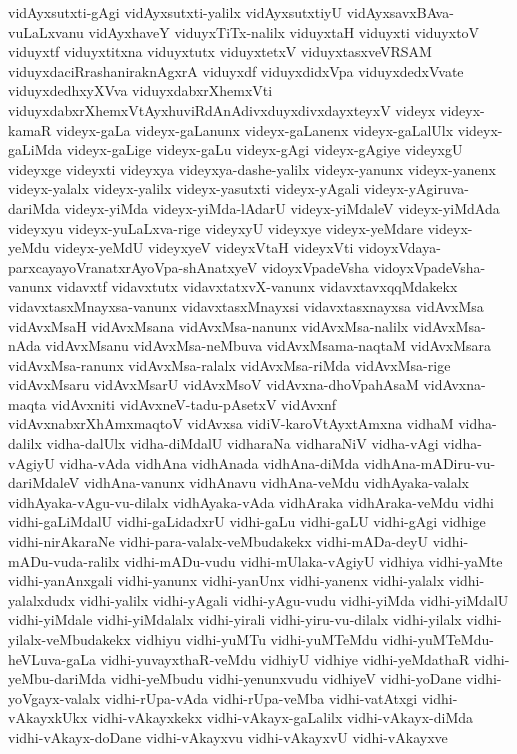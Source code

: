 {vidAyxsutxti-gAgi
vidAyxsutxti-yalilx
vidAyxsutxtiyU
vidAyxsavxBAva-vuLaLxvanu
vidAyxhaveY
viduyxTiTx-nalilx
viduyxtaH
viduyxti
viduyxtoV
viduyxtf
viduyxtitxna
viduyxtutx
viduyxtetxV
viduyxtasxveVRSAM
viduyxdaciRrashaniraknAgxrA
viduyxdf
viduyxdidxVpa
viduyxdedxVvate
viduyxdedhxyXVva
viduyxdabxrXhemxVti
viduyxdabxrXhemxVtAyxhuviRdAnAdivxduyxdivxdayxteyxV
videyx
videyx-kamaR
videyx-gaLa
videyx-gaLanunx
videyx-gaLanenx
videyx-gaLalUlx
videyx-gaLiMda
videyx-gaLige
videyx-gaLu
videyx-gAgi
videyx-gAgiye
videyxgU
videyxge
videyxti
videyxya
videyxya-dashe-yalilx
videyx-yanunx
videyx-yanenx
videyx-yalalx
videyx-yalilx
videyx-yasutxti
videyx-yAgali
videyx-yAgiruva-dariMda
videyx-yiMda
videyx-yiMda-lAdarU
videyx-yiMdaleV
videyx-yiMdAda
videyxyu
videyx-yuLaLxva-rige
videyxyU
videyxye
videyx-yeMdare
videyx-yeMdu
videyx-yeMdU
videyxyeV
videyxVtaH
videyxVti
vidoyxVdaya-parxcayayoVranatxrAyoVpa-shAnatxyeV
vidoyxVpadeVsha
vidoyxVpadeVsha-vanunx
vidavxtf
vidavxtutx
vidavxtatxvX-vanunx
vidavxtavxqqMdakekx
vidavxtasxMnayxsa-vanunx
vidavxtasxMnayxsi
vidavxtasxnayxsa
vidAvxMsa
vidAvxMsaH
vidAvxMsana
vidAvxMsa-nanunx
vidAvxMsa-nalilx
vidAvxMsa-nAda
vidAvxMsanu
vidAvxMsa-neMbuva
vidAvxMsama-naqtaM
vidAvxMsara
vidAvxMsa-ranunx
vidAvxMsa-ralalx
vidAvxMsa-riMda
vidAvxMsa-rige
vidAvxMsaru
vidAvxMsarU
vidAvxMsoV
vidAvxna-dhoVpahAsaM
vidAvxna-maqta
vidAvxniti
vidAvxneV-tadu-pAsetxV
vidAvxnf
vidAvxnabxrXhAmxmaqtoV
vidAvxsa
vidiV-karoVtAyxtAmxna
vidhaM
vidha-dalilx
vidha-dalUlx
vidha-diMdalU
vidharaNa
vidharaNiV
vidha-vAgi
vidha-vAgiyU
vidha-vAda
vidhAna
vidhAnada
vidhAna-diMda
vidhAna-mADiru-vu-dariMdaleV
vidhAna-vanunx
vidhAnavu
vidhAna-veMdu
vidhAyaka-valalx
vidhAyaka-vAgu-vu-dilalx
vidhAyaka-vAda
vidhAraka
vidhAraka-veMdu
vidhi
vidhi-gaLiMdalU
vidhi-gaLidadxrU
vidhi-gaLu
vidhi-gaLU
vidhi-gAgi
vidhige
vidhi-nirAkaraNe
vidhi-para-valalx-veMbudakekx
vidhi-mADa-deyU
vidhi-mADu-vuda-ralilx
vidhi-mADu-vudu
vidhi-mUlaka-vAgiyU
vidhiya
vidhi-yaMte
vidhi-yanAnxgali
vidhi-yanunx
vidhi-yanUnx
vidhi-yanenx
vidhi-yalalx
vidhi-yalalxdudx
vidhi-yalilx
vidhi-yAgali
vidhi-yAgu-vudu
vidhi-yiMda
vidhi-yiMdalU
vidhi-yiMdale
vidhi-yiMdalalx
vidhi-yirali
vidhi-yiru-vu-dilalx
vidhi-yilalx
vidhi-yilalx-veMbudakekx
vidhiyu
vidhi-yuMTu
vidhi-yuMTeMdu
vidhi-yuMTeMdu-heVLuva-gaLa
vidhi-yuvayxthaR-veMdu
vidhiyU
vidhiye
vidhi-yeMdathaR
vidhi-yeMbu-dariMda
vidhi-yeMbudu
vidhi-yenunxvudu
vidhiyeV
vidhi-yoDane
vidhi-yoVgayx-valalx
vidhi-rUpa-vAda
vidhi-rUpa-veMba
vidhi-vatAtxgi
vidhi-vAkayxkUkx
vidhi-vAkayxkekx
vidhi-vAkayx-gaLalilx
vidhi-vAkayx-diMda
vidhi-vAkayx-doDane
vidhi-vAkayxvu
vidhi-vAkayxvU
vidhi-vAkayxve
}
